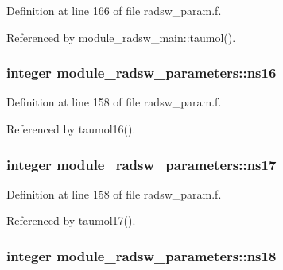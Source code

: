 Definition at line 166 of file radsw\+\_\+param.\+f.



Referenced by module\+\_\+radsw\+\_\+main\+::taumol().

\subsubsection[{\texorpdfstring{ns16}{ns16}}]{\setlength{\rightskip}{0pt plus 5cm}integer module\+\_\+radsw\+\_\+parameters\+::ns16}\hypertarget{namespacemodule__radsw__parameters_a3e6e310ecc531e2d0db52864468dc4a7}{}\label{namespacemodule__radsw__parameters_a3e6e310ecc531e2d0db52864468dc4a7}


Definition at line 158 of file radsw\+\_\+param.\+f.



Referenced by taumol16().

\subsubsection[{\texorpdfstring{ns17}{ns17}}]{\setlength{\rightskip}{0pt plus 5cm}integer module\+\_\+radsw\+\_\+parameters\+::ns17}\hypertarget{namespacemodule__radsw__parameters_a08303e69e406f6bb2af252b1b7dff272}{}\label{namespacemodule__radsw__parameters_a08303e69e406f6bb2af252b1b7dff272}


Definition at line 158 of file radsw\+\_\+param.\+f.



Referenced by taumol17().

\subsubsection[{\texorpdfstring{ns18}{ns18}}]{\setlength{\rightskip}{0pt plus 5cm}integer module\+\_\+radsw\+\_\+parameters\+::ns18}\hypertarget{namespacemodule__radsw__parameters_a142f7aa9f12272d721cfeae2855eec49}{}\label{namespacemodule__radsw__parameters_a142f7aa9f12272d721cfeae2855eec49}


